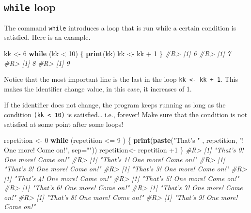 \documentclass[]{book}
\newenvironment{Shaded}{}{}
\newcommand{\CommentTok}[1]{\textcolor[rgb]{0.38,0.63,0.69}{\textit{#1}}}
\newcommand{\ControlFlowTok}[1]{\textcolor[rgb]{0.00,0.44,0.13}{\textbf{#1}}}
\newcommand{\DataTypeTok}[1]{\textcolor[rgb]{0.56,0.13,0.00}{#1}}
\newcommand{\DecValTok}[1]{\textcolor[rgb]{0.25,0.63,0.44}{#1}}
\newcommand{\KeywordTok}[1]{\textcolor[rgb]{0.00,0.44,0.13}{\textbf{#1}}}
\newcommand{\NormalTok}[1]{#1}
\newcommand{\OperatorTok}[1]{\textcolor[rgb]{0.40,0.40,0.40}{#1}}
\newcommand{\StringTok}[1]{\textcolor[rgb]{0.25,0.44,0.63}{#1}}
\theoremstyle{definition}
\theoremstyle{definition}
\theoremstyle{definition}
\theoremstyle{remark}
\begin{document}
\hypertarget{while-loop}{%
\subsection{\texorpdfstring{\texttt{while}
loop}{while loop}}\label{while-loop}}

The command \texttt{while} introduces a loop that is run while a certain
condition is satisfied. Here is an example.

\begin{Shaded}
\begin{Highlighting}[]
\NormalTok{kk <-}\StringTok{ }\DecValTok{6}
\ControlFlowTok{while}\NormalTok{ (kk }\OperatorTok{<}\StringTok{ }\DecValTok{10}\NormalTok{) \{}
  \KeywordTok{print}\NormalTok{(kk)}
\NormalTok{  kk <-}\StringTok{ }\NormalTok{kk }\OperatorTok{+}\StringTok{ }\DecValTok{1}
\NormalTok{\}}
\CommentTok{#R> [1] 6}
\CommentTok{#R> [1] 7}
\CommentTok{#R> [1] 8}
\CommentTok{#R> [1] 9}
\end{Highlighting}
\end{Shaded}

Notice that the most important line is the last in the loop
\texttt{kk\ \textless{}-\ kk\ +\ 1}. This makes the identifier change
value, in this case, it increases of 1.

If the identifier does not change, the program keeps running as long as
the condition \texttt{(kk\ \textless{}\ 10)} is satisfied\ldots{} i.e.,
forever! Make sure that the condition is not satisfied at some point
after some loops!

\begin{Shaded}
\begin{Highlighting}[]
\NormalTok{repetition <-}\StringTok{ }\DecValTok{0}
\ControlFlowTok{while}\NormalTok{ (repetition }\OperatorTok{<=}\StringTok{ }\DecValTok{9}\NormalTok{ ) \{}
  \KeywordTok{print}\NormalTok{(}\KeywordTok{paste}\NormalTok{(}\StringTok{"That's "}\NormalTok{ , repetition, }\StringTok{"! One more! Come on!"}\NormalTok{, }\DataTypeTok{sep=}\StringTok{""}\NormalTok{)) }
\NormalTok{  repetition<-}\StringTok{ }\NormalTok{repetition }\OperatorTok{+}\DecValTok{1}
\NormalTok{\}}
\CommentTok{#R> [1] "That's 0! One more! Come on!"}
\CommentTok{#R> [1] "That's 1! One more! Come on!"}
\CommentTok{#R> [1] "That's 2! One more! Come on!"}
\CommentTok{#R> [1] "That's 3! One more! Come on!"}
\CommentTok{#R> [1] "That's 4! One more! Come on!"}
\CommentTok{#R> [1] "That's 5! One more! Come on!"}
\CommentTok{#R> [1] "That's 6! One more! Come on!"}
\CommentTok{#R> [1] "That's 7! One more! Come on!"}
\CommentTok{#R> [1] "That's 8! One more! Come on!"}
\CommentTok{#R> [1] "That's 9! One more! Come on!"}
\end{Highlighting}
\end{Shaded}
\end{document}
